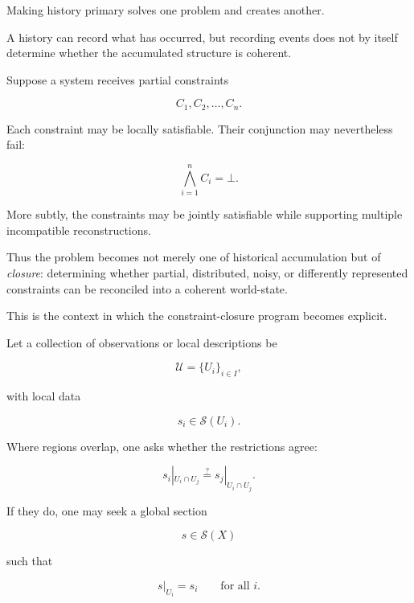 \documentclass[11pt]{article}
\theoremstyle{remark}
\begin{document}
Making history primary solves one problem and creates another.

A history can record what has occurred, but recording events does not by itself determine whether the accumulated structure is coherent.

Suppose a system receives partial constraints

\begin{equation}
C_1,C_2,\ldots,C_n.
\end{equation}

Each constraint may be locally satisfiable. Their conjunction may nevertheless fail:

\begin{equation}
\bigwedge_{i=1}^{n} C_i
=
\bot.
\end{equation}

More subtly, the constraints may be jointly satisfiable while supporting multiple incompatible reconstructions.

Thus the problem becomes not merely one of historical accumulation but of \emph{closure}: determining whether partial, distributed, noisy, or differently represented constraints can be reconciled into a coherent world-state.

This is the context in which the constraint-closure program becomes explicit.

Let a collection of observations or local descriptions be

\begin{equation}
\mathcal{U}
=
\{U_i\}_{i\in I},
\end{equation}

with local data

\begin{equation}
s_i\in\mathcal{S}(U_i).
\end{equation}

Where regions overlap, one asks whether the restrictions agree:

\begin{equation}
s_i|_{U_i\cap U_j}
\stackrel{?}{=}
s_j|_{U_i\cap U_j}.
\end{equation}

If they do, one may seek a global section

\begin{equation}
s\in\mathcal{S}(X)
\end{equation}

such that

\begin{equation}
s|_{U_i}=s_i
\qquad
\text{for all }i.
\end{equation}
\end{document}
